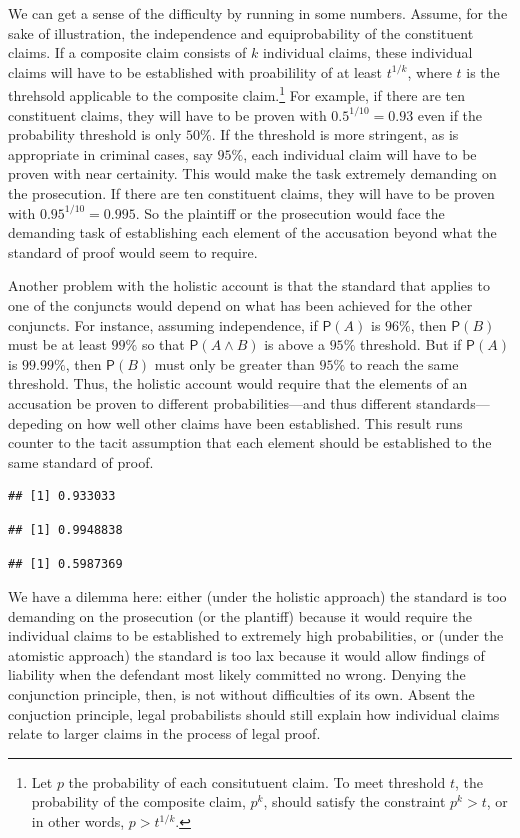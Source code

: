 \documentclass[10pt,dvipsnames,enabledeprecatedfontcommands]{scrartcl}
\newcommand{\et}{\wedge}
\newcommand{\pr}[1]{\mathsf{P}(#1)}
\begin{document}
We can get a sense of the difficulty by running in some numbers. Assume,
for the sake of illustration, the independence and equiprobability of
the constituent claims. If a composite claim consists of \(k\)
individual claims, these individual claims will have to be established
with proabilility of at least \(t^{1/k}\), where \(t\) is the threhsold
applicable to the composite
claim.\footnote{Let $p$ the probability of each consitutuent claim. To meet threshold $t$, the probability of the composite claim, $p^k$, should satisfy the constraint $p^k>t$, or in other words, $p>t^{1/k}$.}
For example, if there are ten constituent claims, they will have to be
proven with \(0.5^{1/10}=0.93\) even if the probability threshold is
only \(50\%\). If the threshold is more stringent, as is appropriate in
criminal cases, say \(95\%\), each individual claim will have to be
proven with near certainity. This would make the task extremely
demanding on the prosecution. If there are ten constituent claims, they
will have to be proven with \(0.95^{1/10}=0.995\). So the plaintiff or
the prosecution would face the demanding task of establishing each
element of the accusation beyond what the standard of proof would seem
to require.

Another problem with the holistic account is that the standard that
applies to one of the conjuncts would depend on what has been achieved
for the other conjuncts. For instance, assuming independence, if
\(\pr{A}\) is \(96\%\), then \(\pr{B}\) must be at least \(99\%\) so
that \(\pr{A\et B}\) is above a \(95\%\) threshold. But if \(\pr{A}\) is
\(99.99\%\), then \(\pr{B}\) must only be greater than \(95\%\) to reach
the same threshold. Thus, the holistic account would require that the
elements of an accusation be proven to different probabilities---and
thus different standards---depeding on how well other claims have been
established. This result runs counter to the tacit assumption that each
element should be established to the same standard of proof.

\begin{verbatim}
## [1] 0.933033
\end{verbatim}

\begin{verbatim}
## [1] 0.9948838
\end{verbatim}

\begin{verbatim}
## [1] 0.5987369
\end{verbatim}

We have a dilemma here: either (under the holistic approach) the
standard is too demanding on the prosecution (or the plantiff) because
it would require the individual claims to be established to extremely
high probabilities, or (under the atomistic approach) the standard is
too lax because it would allow findings of liability when the defendant
most likely committed no wrong. Denying the conjunction principle, then,
is not without difficulties of its own. Absent the conjuction principle,
legal probabilists should still explain how individual claims relate to
larger claims in the process of legal proof.
\end{document}
